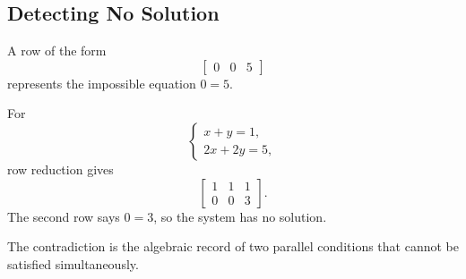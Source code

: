 \subsection{Detecting No Solution}

A row of the form
\[
\left[\begin{array}{cc|c}0&0&5\end{array}\right]
\]
represents the impossible equation $0=5$.

\begin{examplebox}
For
\[
\begin{cases}
x+y=1,\\
2x+2y=5,
\end{cases}
\]
row reduction gives
\[
\left[\begin{array}{cc|c}
1&1&1\\0&0&3
\end{array}\right].
\]
The second row says $0=3$, so the system has no solution.
\end{examplebox}

The contradiction is the algebraic record of two parallel conditions that cannot be satisfied simultaneously.